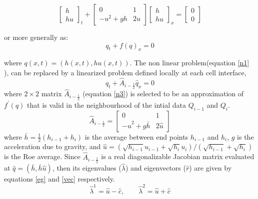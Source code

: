 \documentclass[12pt,a4paper]{article}
\begin{document}
	\begin{equation}
		\begin{bmatrix} h \\ hu \end{bmatrix}_t + 
		\begin{bmatrix} 0 &  1 \\ -u^{2} + gh & 2u \end{bmatrix} 
		\begin{bmatrix} h \\ hu \end{bmatrix}_x =  
		\begin{bmatrix} 0 \\ 0 \end{bmatrix}
		\label{p4}
	\end{equation}
	
	\noindent or more generally as:
	\begin{equation}
		 q_t +  f(q)_x = 0
		\label{n1}
	\end{equation}
	
	\noindent where $ q(x,t) = (h(x,t), hu(x,t))$. The non linear problem(equation \eqref{n1} ), can be replaced by a linearized problem defined locally at each cell interface,
	\begin{equation}
		\hat{q}_t + \hat{A}_{i-\frac{1}{2}}  \hat{q}_x  = 0
		\label{n2}
	\end{equation}
\noindent where $2 \times 2$ matrix $\hat{A}_{i-\frac{1}{2}} $ (equation \eqref{n3}) is selected to be an approximation of $f^{\prime}(q)$ that is valid in the neighbourhood of the intial data $Q_{i-1}$ and $Q_{i}$.
	\begin{equation}
 \hat{A}_{i-\frac{1}{2}} =  \begin{bmatrix} 0 &  1 \\ -\hat{u}^{2} + g\bar{h} & 2\hat{u} \end{bmatrix} 
 \label{n3}
\end{equation}
	\noindent where $\bar{h} = \frac{1}{2}(h_{i-1} + h_{i})$ is the average between end points $h_{i-1}$ and $h_{i}$, $g$ is the acceleration due to gravity, and $\hat{u} = (\sqrt{h_{i-1} }u_{i-1} + \sqrt{h_i}u_i)/(\sqrt{h_{i-1}} + \sqrt{h_i})$ is the Roe average. Since $\hat{A}_{i-\frac{1}{2}} $ is a real diagonalizable Jacobian matrix evaluated at $\hat{q} = (\bar{h},\bar{h}\hat{u})$, then its eigenvalues ($\hat{\lambda}$) and eigenvectors ($\hat{r}$) are given by equations  \eqref{eg} and \eqref{vec} respectively.
	\begin{equation}
		\hat{\lambda}^1 = \hat{u} - \hat{c}, \qquad 	\hat{\lambda}^2 = \hat{u} + \hat{c}
		\label{eg}
	\end{equation}
	
\end{document}
